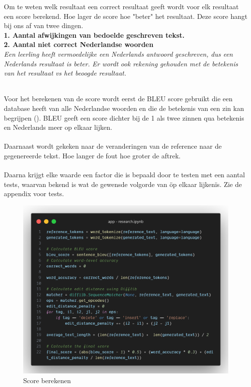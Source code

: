 \documentclass[12pt]{article}
\begin{document}
Om te weten welk resultaat een correct resultaat geeft wordt voor elk resultaat een score berekend. Hoe lager de score hoe "beter" het resultaat. Deze score hangt bij ons af van twee dingen. \\
\textbf{1. Aantal afwijkingen van bedoelde geschreven tekst.}\\
\textbf{2. Aantal niet correct Nederlandse woorden}\\
\hspace{3em}\textit{Een leerling heeft vermoedelijke een Nederlands antwoord geschreven, dus een Nederlands resultaat is beter. Er wordt ook rekening gehouden met de betekenis van het resultaat vs het beoogde resultaat.}\\
\\
\begin{minipage}{0.5\linewidth}
Voor het berekenen van de score wordt eerst de BLEU score gebruikt die een database heeft van alle Nederlandse woorden en die de betekenis van een zin kan begrijpen (\cite{academypublicationBLEUtranslation, aclBLEUevaluation, mediumBLEU}). BLEU geeft een score dichter bij de 1 als twee zinnen qua betekenis en Nederlands meer op elkaar lijken. \\
\\
Daarnaast wordt gekeken naar de veranderingen van de reference naar de gegenereerde tekst. Hoe langer de fout hoe groter de aftrek. \\
\\
Daarna krijgt elke waarde een factor die is bepaald door te testen met een aantal tests, waarvan bekend is wat de gewensde volgorde van \"op elkaar lijken\" is. 
Zie de appendix voor tests.
\end{minipage}%
\hspace{0.4cm}%
\begin{minipage}{0.5\linewidth}
\begin{figure}[H]
    \centering
    \includegraphics[width=\linewidth]{./images/methoden/inscannen/score/code-score.png}
    \caption{Score berekenen}
    \label{fig:score-calc-code}
\end{figure}
\end{minipage}
\end{document}
